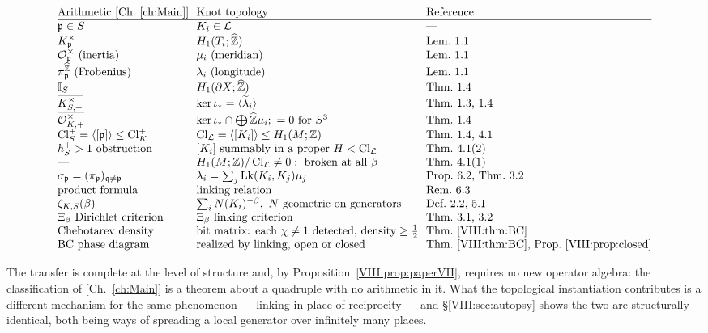 \[
\begin{array}{@{}l@{\ \ }l@{\ \ }l@{}}
\text{Arithmetic [Ch.~\ref{ch:Main}]} & \text{Knot topology} & \text{Reference}\\\hline
\pp\in S & K_i\in\cL & \text{---}\\
K_\pp^\times & H_1(T_i;\hZ) & \text{Lem.~1.1}\\
\cO_\pp^\times\ (\text{inertia}) & \mu_i\ (\text{meridian}) & \text{Lem.~1.1}\\
\pi_\pp^{\hZ}\ (\text{Frobenius}) & \lambda_i\ (\text{longitude}) & \text{Lem.~1.1}\\
\Idl_S & H_1(\partial X;\hZ) & \text{Thm.~1.4}\\
\overline{K^\times_{S,+}} & \ker\iota_*=\langle\tlam_i\rangle & \text{Thm.~1.3, 1.4}\\
\overline{\cO^\times_{K,+}} & \ker\iota_*\cap\bigoplus\hZ\mu_i;\ =0\text{ for }S^3 & \text{Thm.~1.4}\\
\Cl^+_S=\langle[\pp]\rangle\le\Cl^+_K & \Cl_\cL=\langle[K_i]\rangle\le H_1(M;\Z) & \text{Thm.~1.4, 4.1}\\
h^+_S>1\ \text{obstruction} & [K_i]\text{ summably in a proper }H<\Cl_\cL & \text{Thm.~4.1(2)}\\
\text{---} & H_1(M;\Z)/\Cl_\cL\ne0:\ \text{broken at all }\beta & \text{Thm.~4.1(1)}\\
\sigma_\pp=(\pi_\pp)_{\qq\ne\pp} & \lambda_i=\sum_j\Lk(K_i,K_j)\mu_j & \text{Prop.~6.2, Thm.~3.2}\\
\text{product formula} & \text{linking relation} & \text{Rem.~6.3}\\
\zeta_{K,S}(\beta) & \sum_iN(K_i)^{-\beta},\ N\text{ geometric on generators} & \text{Def.~2.2, 5.1}\\
\Xi_\beta\ \text{Dirichlet criterion} & \Xi_\beta\ \text{linking criterion} & \text{Thm.~3.1, 3.2}\\
\text{Chebotarev density} & \text{bit matrix: each }\chi\ne1\text{ detected, density}\ge\tfrac12 & \text{Thm.~\ref{VIII:thm:BC}}\\
\text{BC phase diagram} & \text{realized by linking, open or closed} & \text{Thm.~\ref{VIII:thm:BC}, Prop.~\ref{VIII:prop:closed}}
\end{array}
\]

The transfer is complete at the level of structure and, by Proposition~\ref{VIII:prop:paperVII},
requires no new operator algebra: the classification of [Ch.~\ref{ch:Main}] is a theorem about a
quadruple with no arithmetic in it. What the topological instantiation contributes is a
different mechanism for the same phenomenon --- linking in place of reciprocity --- and
\S\ref{VIII:sec:autopsy} shows the two are structurally identical, both being ways of spreading a
local generator over infinitely many places.

